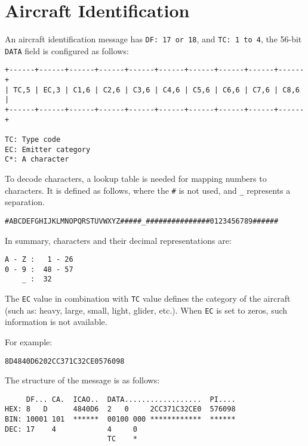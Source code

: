 \section{Aircraft Identification}\label{aircraft-identification}

An aircraft identification message has \texttt{DF:\ 17\ or\ 18}, and \texttt{TC:\ 1\ to\ 4}, the 56-bit \texttt{DATA} field is configured as follows:

\begin{verbatim}
+------+------+------+------+------+------+------+------+------+------+
| TC,5 | EC,3 | C1,6 | C2,6 | C3,6 | C4,6 | C5,6 | C6,6 | C7,6 | C8,6 |
+------+------+------+------+------+------+------+------+------+------+

TC: Type code
EC: Emitter category
C*: A character
\end{verbatim}

To decode characters, a lookup table is needed for mapping numbers to characters. It is defined as follows, where the \texttt{\#} is not used, and \texttt{\_} represents a separation.

\begin{verbatim}
#ABCDEFGHIJKLMNOPQRSTUVWXYZ#####_###############0123456789######
\end{verbatim}

In summary, characters and their decimal representations are:

\begin{verbatim}
A - Z :   1 - 26
0 - 9 :  48 - 57
    _ :  32
\end{verbatim}

The \texttt{EC} value in combination with \texttt{TC} value defines the category of the aircraft (such as: heavy, large, small, light, glider, etc.). When \texttt{EC} is set to zeros, such information is not available.

For example:

\begin{verbatim}
8D4840D6202CC371C32CE0576098
\end{verbatim}

The structure of the message is as follows:

\begin{verbatim}
     DF... CA.  ICAO..  DATA..................  PI....
HEX: 8   D      4840D6  2   0     2CC371C32CE0  576098
BIN: 10001 101  ******  00100 000 ************  ******
DEC: 17    4            4     0
                        TC    *
\end{verbatim}


